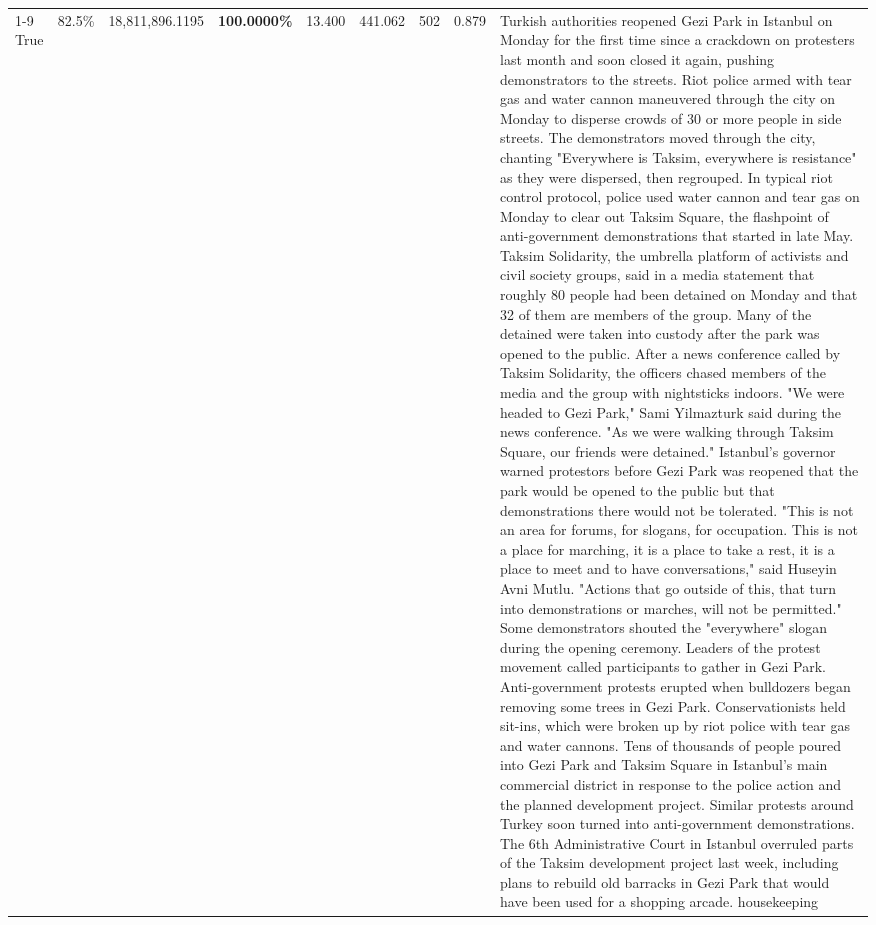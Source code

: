 \begin{table}[H]
\begin{tabular}{lllrlllll}
\cline{1-9}
True & 82.5\% & 18,811,896.1195 & \bfseries \color{red} 100.0000\% & 13.400 & 441.062 & 502 & 0.879 & Turkish authorities reopened Gezi Park in Istanbul on Monday for the first time since a crackdown on protesters last month and soon closed it again, pushing demonstrators to the streets. Riot police armed with tear gas and water cannon maneuvered through the city on Monday to disperse crowds of 30 or more people in side streets. The demonstrators moved through the city, chanting "Everywhere is Taksim, everywhere is resistance" as they were dispersed, then regrouped. In typical riot control protocol, police used water cannon and tear gas on Monday to clear out Taksim Square, the flashpoint of anti-government demonstrations that started in late May. Taksim Solidarity, the umbrella platform of activists and civil society groups, said in a media statement that roughly 80 people had been detained on Monday and that 32 of them are members of the group. Many of the detained were taken into custody after the park was opened to the public. After a news conference called by Taksim Solidarity, the officers chased members of the media and the group with nightsticks indoors. "We were headed to Gezi Park," Sami Yilmazturk said during the news conference. "As we were walking through Taksim Square, our friends were detained." Istanbul's governor warned protestors before Gezi Park was reopened that the park would be opened to the public but that demonstrations there would not be tolerated. "This is not an area for forums, for slogans, for occupation. This is not a place for marching, it is a place to take a rest, it is a place to meet and to have conversations," said Huseyin Avni Mutlu. "Actions that go outside of this, that turn into demonstrations or marches, will not be permitted." Some demonstrators shouted the "everywhere" slogan during the opening ceremony. Leaders of the protest movement called participants to gather in Gezi Park. Anti-government protests erupted when bulldozers began removing some trees in Gezi Park. Conservationists held sit-ins, which were broken up by riot police with tear gas and water cannons. Tens of thousands of people poured into Gezi Park and Taksim Square in Istanbul's main commercial district in response to the police action and the planned development project. Similar protests around Turkey soon turned into anti-government demonstrations. The 6th Administrative Court in Istanbul overruled parts of the Taksim development project last week, including plans to rebuild old barracks in Gezi Park that would have been used for a shopping arcade. housekeeping \\

\end{tabular}
\end{table}
